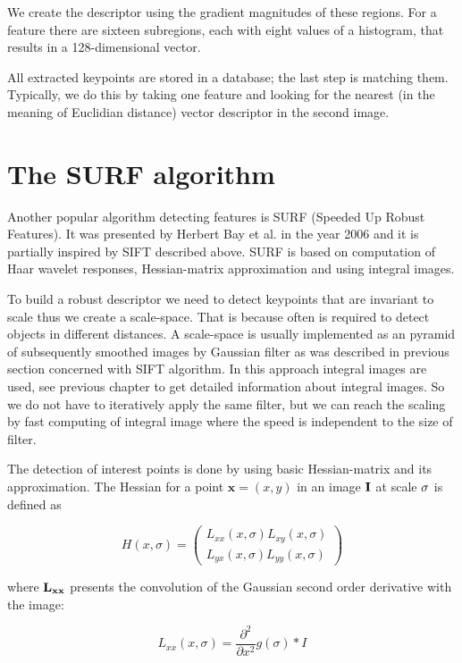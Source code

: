 We create the descriptor using the gradient magnitudes of these regions.
For a feature there are sixteen subregions, each with eight values of a histogram, that results in a 128-dimensional vector.

All extracted keypoints are stored in a database; the last step is matching them.
Typically, we do this by taking one feature and looking for the nearest (in the meaning of Euclidian distance) vector descriptor in the second image.

\pagebreak
\section{The SURF algorithm}
Another popular algorithm detecting features is SURF (Speeded Up Robust Features).
It was presented by Herbert Bay et al. \cite{surf2006} in the year 2006 and it is partially inspired by SIFT described above.
SURF is based on computation of Haar wavelet responses, Hessian-matrix approximation and using integral images.

To build a robust descriptor we need to detect keypoints that are invariant to scale thus we create a scale-space.
That is because often is required to detect objects in different distances.
A scale-space is usually implemented as an pyramid of subsequently smoothed images by Gaussian filter as was described in previous section concerned with SIFT algorithm.
In this approach integral images are used, see previous chapter to get detailed information about integral images.
So we do not have to iteratively apply the same filter, but we can reach the scaling by fast computing of integral image where the speed is independent to the size of filter.

The detection of interest points is done by using basic Hessian-matrix and its approximation. 
The Hessian for a point $\mathbf{x} = (x, y)$ in an image $\mathbf{I}$ at scale $\mathbf{\sigma}$ is defined as

\[ H(x, \sigma) = \left(\begin{array}{c}  
L_{xx}(x, \sigma)  L_{xy}(x, \sigma) \\ 
L_{yx}(x, \sigma)  L_{yy}(x, \sigma)

\end{array}\right)  \]

where $\mathbf{L_{xx}}$ presents the convolution of the Gaussian second order derivative with the image:

\[
L_{xx}(x, \sigma) = \frac{\partial ^{2}}{\partial x^{2}}g(\sigma) * I
\]

